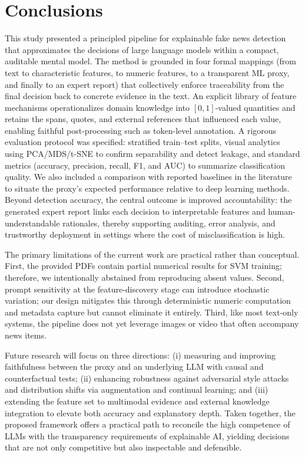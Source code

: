 \documentclass[ai,article,submit,pdftex,moreauthors]{Definitions/mdpi}
\begin{document}
\section{Conclusions}

This study presented a principled pipeline for explainable fake news detection that approximates the decisions of large language models within a compact, auditable mental model. The method is grounded in four formal mappings (from text to characteristic features, to numeric features, to a transparent ML proxy, and finally to an expert report) that collectively enforce traceability from the final decision back to concrete evidence in the text. An explicit library of feature mechanisms operationalizes domain knowledge into $[0,1]$-valued quantities and retains the spans, quotes, and external references that influenced each value, enabling faithful post-processing such as token-level annotation. A rigorous evaluation protocol was specified: stratified train--test splits, visual analytics using PCA/MDS/t-SNE to confirm separability and detect leakage, and standard metrics (accuracy, precision, recall, F1, and AUC) to summarize classification quality. We also included a comparison with reported baselines in the literature to situate the proxy’s expected performance relative to deep learning methods. Beyond detection accuracy, the central outcome is improved accountability: the generated expert report links each decision to interpretable features and human-understandable rationales, thereby supporting auditing, error analysis, and trustworthy deployment in settings where the cost of misclassification is high.

The primary limitations of the current work are practical rather than conceptual. First, the provided PDFs contain partial numerical results for SVM training; therefore, we intentionally abstained from reproducing absent values. Second, prompt sensitivity at the feature-discovery stage can introduce stochastic variation; our design mitigates this through deterministic numeric computation and metadata capture but cannot eliminate it entirely. Third, like most text-only systems, the pipeline does not yet leverage images or video that often accompany news items.

Future research will focus on three directions: (i) measuring and improving faithfulness between the proxy and an underlying LLM with causal and counterfactual tests; (ii) enhancing robustness against adversarial style attacks and distribution shifts via augmentation and continual learning; and (iii) extending the feature set to multimodal evidence and external knowledge integration to elevate both accuracy and explanatory depth. Taken together, the proposed framework offers a practical path to reconcile the high competence of LLMs with the transparency requirements of explainable AI, yielding decisions that are not only competitive but also inspectable and defensible.
\end{document}

